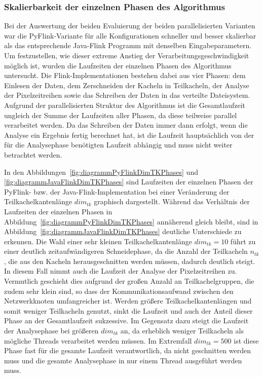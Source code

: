 \subsubsection{Skalierbarkeit der einzelnen Phasen des Algorithmus}
Bei der Auswertung der beiden Evaluierung der beiden parallelisierten Varianten war die PyFlink-Variante für alle Konfigurationen schneller und besser skalierbar als das entsprechende Java-Flink Programm mit denselben Eingabeparametern. Um  festzustellen, wie dieser extreme Anstieg der Verarbeitungsgeschwindigkeit möglich ist, wurden die Laufzeiten der einzelnen Phasen des Algorithmus untersucht. Die Flink-Implementationen bestehen dabei aus vier Phasen: dem Einlesen der Daten, dem Zerschneiden der Kacheln in Teilkacheln, der Analyse der Pixelzeitreihen sowie das Schreiben der Daten in das verteilte Dateisystem. Aufgrund der parallelisierten Struktur des Algorithmus ist die Gesamtlaufzeit ungleich der Summe der Laufzeiten aller Phasen, da diese teilweise parallel verarbeitet werden. Da das Schreiben der Daten immer dann erfolgt, wenn die Analyse ein Ergebnis fertig berechnet hat, ist die Laufzeit hauptsächlich von der für die Analysephase benötigten Laufzeit abhängig und muss nicht weiter betrachtet werden.

In den Abbildungen~\ref{fig:diagrammPyFlinkDimTKPhases} und \ref{fig:diagrammJavaFlinkDimTKPhases} sind Laufzeiten der einzelnen Phasen der PyFlink- bzw. der Java-Flink-Implementation bei einer Veränderung der Teilkachelkantenlänge $dim_{tk}$ graphisch dargestellt. Während das Verhältnis der Laufzeiten der einzelnen Phasen in Abbildung~\ref{fig:diagrammPyFlinkDimTKPhases} annäherend gleich bleibt, sind in Abbildung~\ref{fig:diagrammJavaFlinkDimTKPhases} deutliche Unterschiede zu erkennen. Die Wahl einer sehr kleinen Teilkachelkantenlänge $dim_{tk} = 10$ führt zu einer deutlich zeitaufwändigeren Schneidephase, da die Anzahl der Teilkacheln $n_{tk}$, die aus den Kacheln herausgeschnitten werden müssen, dadurch deutlich steigt. In diesem Fall nimmt auch die Laufzeit der Analyse der Pixelzeitreihen zu. Vermutlich geschieht dies aufgrund der großen Anzahl an Teilkachelgruppen, die zudem sehr klein sind, so dass der Kommunikationsaufwand zwischen den Netzwerkknoten umfangreicher ist. Werden größere Teilkachelkantenlängen und somit weniger Teilkacheln genutzt, sinkt die Laufzeit und auch der Anteil dieser Phase an der Gesamtlaufzeit sukzessive. Im Gegensatz dazu steigt die Laufzeit der Analysephase bei größeren $dim_{tk}$ an, da erheblich weniger Teilkacheln als mögliche Threads verarbeitet werden müssen. Im Extremfall $dim_{tk}=500$ ist diese Phase fast für die gesamte Laufzeit verantwortlich, da nicht geschnitten werden muss und die gesamte Analysephase in nur einem Thread ausgeführt werden muss. 

